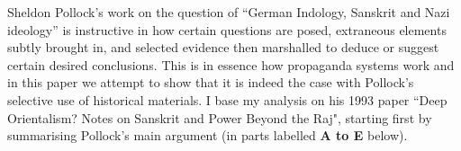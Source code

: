 Sheldon Pollock’s work on the question of “German Indology, Sanskrit and Nazi ideology” is instructive in how certain questions are posed, extraneous elements subtly brought in, and selected evidence then marshalled to deduce or suggest certain desired conclusions. This is in essence how propaganda systems  work and in this paper we attempt to show that it is indeed the case with Pollock's selective use of historical materials. I base my analysis on his 1993 paper ``Deep Orientalism? Notes on Sanskrit and Power Beyond the Raj", starting first by summarising Pollock's main argument (in parts labelled {\bf A to E} below).
